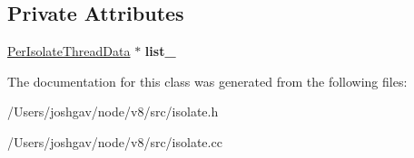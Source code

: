 \subsection*{Private Attributes}
\begin{DoxyCompactItemize}
\item 
\hyperlink{classv8_1_1internal_1_1_isolate_1_1_per_isolate_thread_data}{Per\+Isolate\+Thread\+Data} $\ast$ {\bfseries list\+\_\+}\hypertarget{classv8_1_1internal_1_1_isolate_1_1_thread_data_table_ad01c7fd4ffa6b200216c441aeca471dc}{}\label{classv8_1_1internal_1_1_isolate_1_1_thread_data_table_ad01c7fd4ffa6b200216c441aeca471dc}

\end{DoxyCompactItemize}


The documentation for this class was generated from the following files\+:\begin{DoxyCompactItemize}
\item 
/\+Users/joshgav/node/v8/src/isolate.\+h\item 
/\+Users/joshgav/node/v8/src/isolate.\+cc\end{DoxyCompactItemize}
